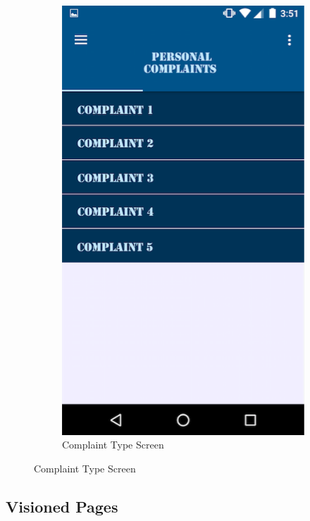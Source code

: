 \documentclass{article}
\begin{document}
	    \begin{figure}[H]
      \centering
      \begin{subfigure}{.5\textwidth}
          \centering
		\includegraphics[width=0.9\linewidth]{test1complaints.png}
          \caption{Complaint Type Screen}
          \label{fig:sub1}
      \end{subfigure}%
      \label{figstart}
    \end{figure}

    	\subsection{Visioned Pages}
\end{document}
